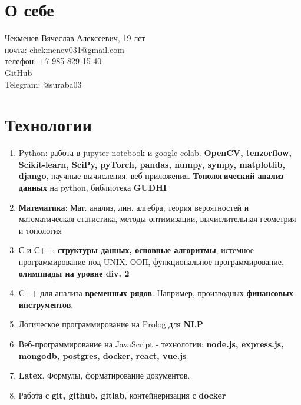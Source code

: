 \documentclass[a4paper,12pt]{article}
\date{}
\begin{document}
\section{О себе}
      \large Чекменев Вячеслав Алексеевич, 19 лет\\
      \large почта: chekmenev031@gmail.com \\
      \large телефон: +7-985-829-15-40 \\
      \large \href{https://github.com/Suraba03}{GitHub} \\
      \large Telegram: @suraba03\\
\section{Технологии}
\begin{enumerate}
    \item \underline{Python}: работа в jupyter notebook и google colab. \textbf{ OpenCV, tenzorflow, Scikit-learn, SciPy, pyTorch, pandas, numpy, sympy, matplotlib, django}, научные вычисления, веб-приложения. \textbf{Топологический анализ данных} на python, библиотека \textbf{GUDHI}
    \item \textbf{Математика}: Мат. анализ, лин. алгебра, теория вероятностей и математическая статистика, методы оптимизации, вычислительная геометрия и топология
    \item \underline{С} и \underline{С++}: \textbf{структуры данных, основные алгоритмы}, истемное программирование под UNIX. ООП, функциональное программирование, \textbf{олимпиады на уровне div. 2} 
    \item C++ для анализа \textbf{временных рядов}. Например, производных \textbf{финансовых инструментов}.
    \item Логическое программирование на \underline{Prolog} для \textbf{NLP}
    \item \underline{Веб-программирование на JavaScript} - технологии: \textbf{node.js, express.js, mongodb, postgres, docker, react, vue.js}
    \item \textbf{Latex}. Формулы, форматирование документов.
    \item Работа с \textbf{git, github, gitlab}, контейнеризация с \textbf{docker}

\end{enumerate}
\end{document}
